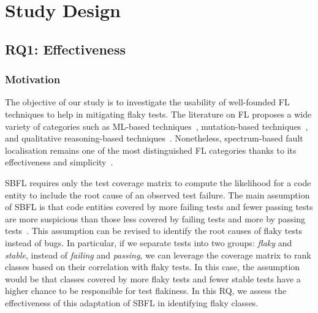 \section{Study Design}
\label{sec:sherloc-design}

\subsection{RQ1: Effectiveness}\label{sub:rq1_effectiveness}
\subsubsection{Motivation}\label{subsub:rq1_motivation}

The objective of our study is to investigate the usability of well-founded FL techniques to help in mitigating flaky tests.
The literature on FL proposes a wide variety of categories such as ML-based techniques~\cite{Lou:2021:fse,DeepFL,briand2007}, mutation-based techniques~\cite{Papadakis:2015sf,Hong:2015db}, and qualitative reasoning-based techniques~\cite{perez2018leveraging}.
Nonetheless, spectrum-based fault localisation remains one of the most distinguished FL categories thanks to its effectiveness and simplicity~\cite{wong2016survey}.

SBFL requires only the test coverage matrix to compute the likelihood for a code entity to include the root cause of an observed test failure. 
The main assumption of SBFL is that code entities covered by more failing tests and fewer passing tests are more suspicious than those less covered by failing tests and more by passing tests~\cite{Renieres2003}.
This assumption can be revised to identify the root causes of flaky tests instead of bugs.
In particular, if we separate tests into two groups: \textit{flaky} and \textit{stable}, instead of \textit{failing} and \textit{passing}, we can leverage the coverage matrix to rank classes based on their correlation with flaky tests. 
In this case, the assumption would be that classes covered by more flaky tests and fewer stable tests have a higher chance to be responsible for test flakiness.
In this RQ, we assess the effectiveness of this adaptation of SBFL in identifying flaky classes. 

